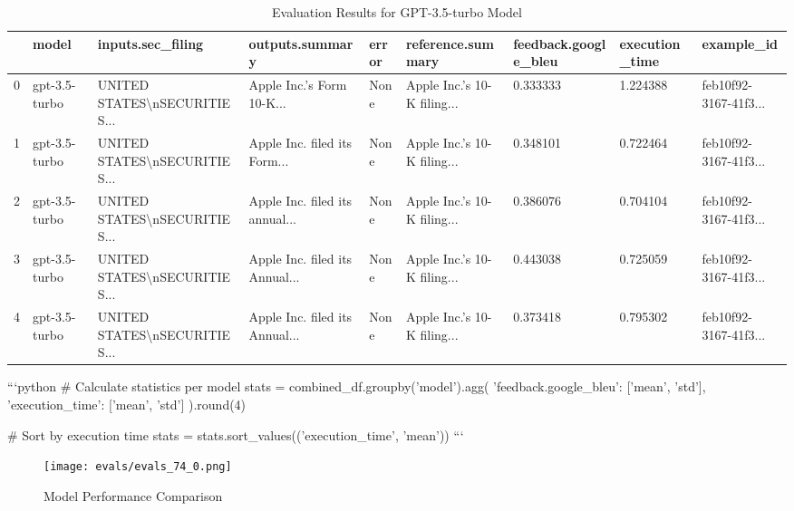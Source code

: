 \begin{table*}[h]
\centering
\begin{tabular}{lllllllll}
\hline
 & model & inputs.sec\_filing & outputs.summary & error & reference.summary & feedback.google\_bleu & execution\_time & example\_id \\
\hline
0 & gpt-3.5-turbo & UNITED STATES\textbackslash nSECURITIES... & Apple Inc.'s Form 10-K... & None & Apple Inc.'s 10-K filing... & 0.333333 & 1.224388 & feb10f92-3167-41f3... \\
1 & gpt-3.5-turbo & UNITED STATES\textbackslash nSECURITIES... & Apple Inc. filed its Form... & None & Apple Inc.'s 10-K filing... & 0.348101 & 0.722464 & feb10f92-3167-41f3... \\
2 & gpt-3.5-turbo & UNITED STATES\textbackslash nSECURITIES... & Apple Inc. filed its annual... & None & Apple Inc.'s 10-K filing... & 0.386076 & 0.704104 & feb10f92-3167-41f3... \\
3 & gpt-3.5-turbo & UNITED STATES\textbackslash nSECURITIES... & Apple Inc. filed its Annual... & None & Apple Inc.'s 10-K filing... & 0.443038 & 0.725059 & feb10f92-3167-41f3... \\
4 & gpt-3.5-turbo & UNITED STATES\textbackslash nSECURITIES... & Apple Inc. filed its Annual... & None & Apple Inc.'s 10-K filing... & 0.373418 & 0.795302 & feb10f92-3167-41f3... \\
\hline
\end{tabular}
\caption{Evaluation Results for GPT-3.5-turbo Model}
\label{tab:eval-results}
\end{table*}



```python
# Calculate statistics per model
stats = combined_df.groupby('model').agg({
    'feedback.google_bleu': ['mean', 'std'],
    'execution_time': ['mean', 'std']
}).round(4)

# Sort by execution time
stats = stats.sort_values(('execution_time', 'mean'))
```

\begin{figure}[h]
\centering
\texttt{[image: evals/evals\_74\_0.png]}
\label{fig:eval-results}
\caption{Model Performance Comparison}
\end{figure}


